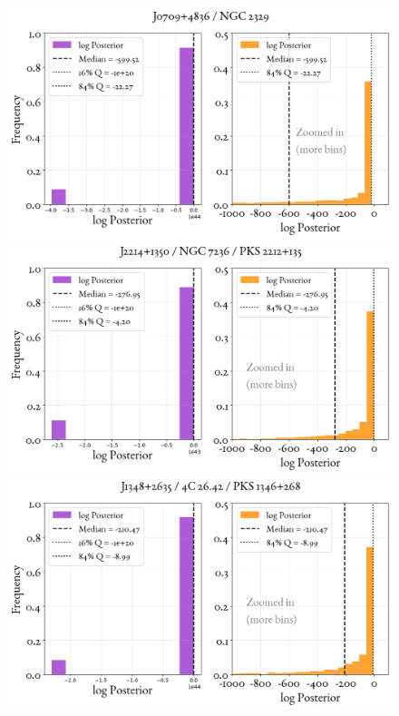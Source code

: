 \begin{figure}
    \centering
    \includegraphics[width=0.8\linewidth]{figures/ResultPosteriors/95_Posterior_5263.png}\\
     \includegraphics[width=0.8\linewidth]{figures/ResultPosteriors/96_Posterior_5275.png}\\
      \includegraphics[width=0.8\linewidth]{figures/ResultPosteriors/103_Posterior_5300.png}  
\end{figure}

